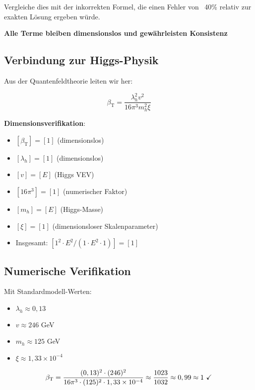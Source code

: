 \documentclass[12pt,a4paper]{article}
\newcommand{\betaT}{\beta_{\text{T}}}
\begin{document}
Vergleiche dies mit der inkorrekten Formel, die einen Fehler von ~40\% relativ zur exakten Lösung ergeben würde.

\textbf{Alle Terme bleiben dimensionslos und gewährleisten Konsistenz} \checkmark
	
	\subsection{Verbindung zur Higgs-Physik}
	\label{subsec:higgs_connection}
	
	Aus der Quantenfeldtheorie leiten wir her:
	
	\begin{equation}
		\label{eq:beta_higgs_formula}
		\betaT = \frac{\lambda_h^2 v^2}{16\pi^3 m_h^2 \xi}
	\end{equation}
	
	\textbf{Dimensionsverifikation}:
	\begin{itemize}
		\item $[\betaT] = [1]$ (dimensionslos)
		\item $[\lambda_h] = [1]$ (dimensionslos)
		\item $[v] = [E]$ (Higgs VEV)
		\item $[16\pi^3] = [1]$ (numerischer Faktor)
		\item $[m_h] = [E]$ (Higgs-Masse)
		\item $[\xi] = [1]$ (dimensionsloser Skalenparameter)
		\item Insgesamt: $[1^2 \cdot E^2 / (1 \cdot E^2 \cdot 1)] = [1]$ \checkmark
	\end{itemize}
	
	\subsection{Numerische Verifikation}
	\label{subsec:numerical_verification}
	
	Mit Standardmodell-Werten:
	\begin{itemize}
		\item $\lambda_h \approx 0,13$
		\item $v \approx 246$ GeV
		\item $m_h \approx 125$ GeV
		\item $\xi \approx 1,33 \times 10^{-4}$
	\end{itemize}
	
	\begin{equation}
		\betaT = \frac{(0,13)^2 \cdot (246)^2}{16\pi^3 \cdot (125)^2 \cdot 1,33 \times 10^{-4}} \approx \frac{1023}{1032} \approx 0,99 \approx 1 \text{ \checkmark}
	\end{equation}
	
\end{document}
